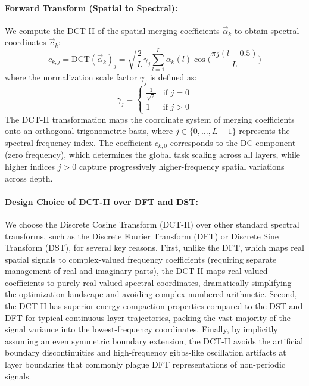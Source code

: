 \paragraph{Forward Transform (Spatial to Spectral):}
We compute the DCT-II of the spatial merging coefficients $\vec{\alpha}_k$ to obtain spectral coordinates $\vec{c}_k$:
\begin{equation}
    c_{k,j} = \text{DCT}(\vec{\alpha}_k)_j = \sqrt{\frac{2}{L}} \gamma_j \sum_{l=1}^L \alpha_k(l) \cos\bigl( \frac{\pi j (l - 0.5)}{L} \bigr)
\end{equation}
where the normalization scale factor $\gamma_j$ is defined as:
\begin{equation}
    \gamma_j = \begin{cases} \frac{1}{\sqrt{2}} & \text{if } j = 0 \\ 1 & \text{if } j > 0 \end{cases}
\end{equation}
The DCT-II transformation maps the coordinate system of merging coefficients onto an orthogonal trigonometric basis, where $j \in \{0, \dots, L-1\}$ represents the spectral frequency index. The coefficient $c_{k,0}$ corresponds to the DC component (zero frequency), which determines the global task scaling across all layers, while higher indices $j > 0$ capture progressively higher-frequency spatial variations across depth.

\paragraph{Design Choice of DCT-II over DFT and DST:} We choose the Discrete Cosine Transform (DCT-II) over other standard spectral transforms, such as the Discrete Fourier Transform (DFT) or Discrete Sine Transform (DST), for several key reasons. First, unlike the DFT, which maps real spatial signals to complex-valued frequency coefficients (requiring separate management of real and imaginary parts), the DCT-II maps real-valued coefficients to purely real-valued spectral coordinates, dramatically simplifying the optimization landscape and avoiding complex-numbered arithmetic. Second, the DCT-II has superior energy compaction properties compared to the DST and DFT for typical continuous layer trajectories, packing the vast majority of the signal variance into the lowest-frequency coordinates. Finally, by implicitly assuming an even symmetric boundary extension, the DCT-II avoids the artificial boundary discontinuities and high-frequency gibbs-like oscillation artifacts at layer boundaries that commonly plague DFT representations of non-periodic signals. 


